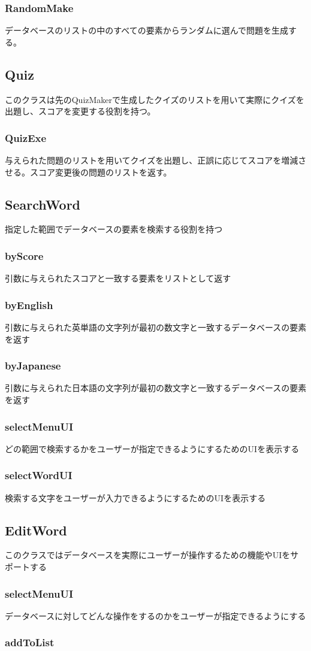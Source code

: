 \documentclass{ltjsarticle}
\begin{document}
\subsubsection{RandomMake}
データベースのリストの中のすべての要素からランダムに選んで問題を生成する。

\subsection{Quiz}
このクラスは先のQuizMakerで生成したクイズのリストを用いて実際にクイズを出題し、スコアを変更する役割を持つ。
\subsubsection{QuizExe}
与えられた問題のリストを用いてクイズを出題し、正誤に応じてスコアを増減させる。スコア変更後の問題のリストを返す。

\subsection{SearchWord}
指定した範囲でデータベースの要素を検索する役割を持つ
\subsubsection{byScore}
引数に与えられたスコアと一致する要素をリストとして返す
\subsubsection{byEnglish}
引数に与えられた英単語の文字列が最初の数文字と一致するデータベースの要素を返す
\subsubsection{byJapanese}
引数に与えられた日本語の文字列が最初の数文字と一致するデータベースの要素を返す
\subsubsection{selectMenuUI}
どの範囲で検索するかをユーザーが指定できるようにするためのUIを表示する
\subsubsection{selectWordUI}
検索する文字をユーザーが入力できるようにするためのUIを表示する
\subsubsection{}
\subsection{EditWord}
このクラスではデータベースを実際にユーザーが操作するための機能やUIをサポートする
\subsubsection{selectMenuUI}
データベースに対してどんな操作をするのかをユーザーが指定できるようにする
\subsubsection{addToList}
\end{document}
